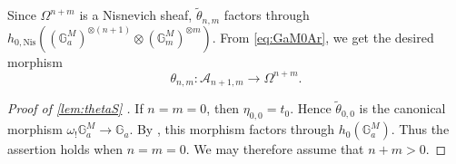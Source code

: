 \documentclass[a4paper,12pt,reqno]{amsart}
\numberwithin{equation}{section}
\theoremstyle{definition}
\newcommand{\bA}{\mathbb{A}}
\newcommand{\Gm}{\mathbb{G}_{m}}
\newcommand{\Ga}{\mathbb{G}_{a}}
\newcommand{\Id}{\mathrm{id}}
\newcommand{\Acal}{\mathcal{A}}
\newcommand{\GaMod}{\mathbb{G}_{a}^{M}}
\newcommand{\GmMod}{\mathbb G_m^M}
\newcommand{\Nis}{\mathrm{Nis}}
\begin{document}
Since $\Omega^{n+m}$ is a Nisnevich sheaf, $\widetilde{\theta}_{n,m}$ factors through $h_{0,\Nis}((\GaMod)^{\otimes (n+1)}\otimes (\GmMod)^{\otimes m})$. From \eqref{eq:GaM0Ar}, we get the desired morphism
\begin{equation}\label{eq:thetaS}
 \theta_{n,m}:\Acal_{n+1,m}\to\Omega^{n+m}.
\end{equation}


\begin{proof}[Proof of \autoref{lem:thetaS} ]
If $n=m=0$, then %
$\eta_{0,0}=t_0$.
Hence $\widetilde{\theta}_{0,0}$ is the canonical morphism
$\omega_!\GaMod\to\Ga$.
By \cite[Section~5.1]{RSY22}, this morphism factors through $h_0(\GaMod)$. 
Thus the assertion holds when $n=m=0$.
We may therefore assume that $n+m>0$.
    

\end{proof}
\end{document}

